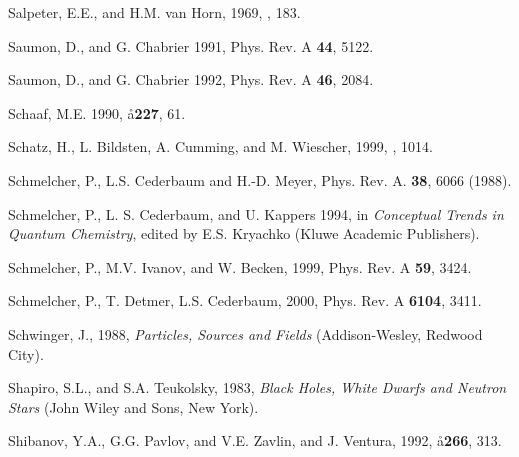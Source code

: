 \begin{references}

\harvarditem{}{}{}
Salpeter, E.E., and H.M. van Horn, 1969, , 183.

\harvarditem{}{}{}
Saumon, D., and G. Chabrier 1991, Phys. Rev. A {\bf 44}, 5122.

\harvarditem{}{}{}
Saumon, D., and G. Chabrier 1992, Phys. Rev. A {\bf 46}, 2084.

\harvarditem{}{}{}
Schaaf, M.E. 1990, \aa {\bf 227}, 61.

\harvarditem{}{}{}
Schatz, H., L. Bildsten, A. Cumming, and M. Wiescher, 1999, ,
1014.

\harvarditem{}{}{}
Schmelcher, P., L.S. Cederbaum and H.-D. Meyer,
Phys. Rev. A. {\bf 38}, 6066 (1988).

\harvarditem{}{}{}
Schmelcher, P., L. S. Cederbaum, and U. Kappers 1994, 
in {\it Conceptual Trends in Quantum Chemistry}, edited by E.S. Kryachko
(Kluwe Academic Publishers).

\harvarditem{}{}{}
Schmelcher, P., M.V. Ivanov, and W. Becken, 1999, Phys. Rev. A
{\bf 59}, 3424.

\harvarditem{}{}{}
Schmelcher, P., T. Detmer, L.S. Cederbaum, 2000, Phys. Rev. A {\bf 6104}, 3411.


\harvarditem{}{}{}
Schwinger, J., 1988, {\it Particles, Sources and Fields} (Addison-Wesley, 
Redwood City).


\harvarditem{}{}{}
Shapiro, S.L., and S.A. Teukolsky, 1983, {\it Black Holes, White Dwarfs and
Neutron Stars} (John Wiley and Sons, New York).

\harvarditem{}{}{}
Shibanov, Y.A., G.G. Pavlov, and V.E. Zavlin, and J. Ventura, 1992,
\aa {\bf 266}, 313.



\end{references}
